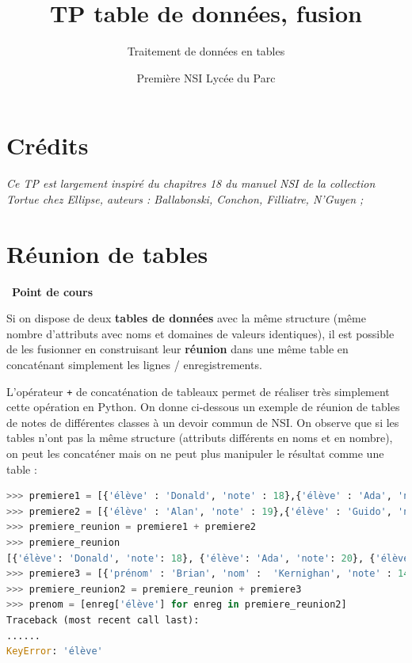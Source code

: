 \documentclass[
  11pt,
]{article}
\title{TP table de données, fusion}
\subtitle{Traitement de données en tables}
\author{Première NSI Lycée du Parc}
\date{}
\newcommand{\passthrough}[1]{#1}
\newcounter{cours}
\newenvironment{cours}[1]
{\par \medskip   \addtocounter{cours}{1} \noindent  
\begin{bclogo}[arrondi =0.1,  ombre = true, barre=none, logo=\bcbook, marge=4]{~\textbf{Point de cours} \textbf{\thecours} {\itshape #1} }  \par}
{
\end{bclogo}
 \par \bigskip }
\begin{document}
\maketitle

\renewcommand*\contentsname{Table des matières}
{
\hypersetup{linkcolor=}
\setcounter{tocdepth}{3}
\tableofcontents
}
\hypertarget{cruxe9dits}{%
\section*{Crédits}\label{cruxe9dits}}

\emph{Ce TP est largement inspiré du chapitres 18 du manuel NSI de la
collection Tortue chez Ellipse, auteurs : Ballabonski, Conchon,
Filliatre, N'Guyen ;}

\hypertarget{ruxe9union-de-tables}{%
\section{Réunion de tables}\label{ruxe9union-de-tables}}

\begin{cours}{}

Si on dispose de deux \textbf{tables de données} avec la même structure
(même nombre d'attributs avec noms et domaines de valeurs identiques),
il est possible de les fusionner en construisant leur \textbf{réunion}
dans une même table en concaténant simplement les lignes /
enregistrements.

L'opérateur \passthrough{\lstinline!+!} de concaténation de tableaux
permet de réaliser très simplement cette opération en Python. On donne
ci-dessous un exemple de réunion de tables de notes de différentes
classes à un devoir commun de NSI. On observe que si les tables n'ont
pas la même structure (attributs différents en noms et en nombre), on
peut les concaténer mais on ne peut plus manipuler le résultat comme une
table :

\begin{lstlisting}[language=Python]
>>> premiere1 = [{'élève' : 'Donald', 'note' : 18},{'élève' : 'Ada', 'note' : 20}]
>>> premiere2 = [{'élève' : 'Alan', 'note' : 19},{'élève' : 'Guido', 'note' : 12}]
>>> premiere_reunion = premiere1 + premiere2
>>> premiere_reunion
[{'élève': 'Donald', 'note': 18}, {'élève': 'Ada', 'note': 20}, {'élève': 'Alan', 'note': 19}, {'élève': 'Guido', 'note': 12}]
>>> premiere3 = [{'prénom' : 'Brian', 'nom' :  'Kernighan', 'note' : 14},{'prénom' : 'Linus', 'nom' : 'Torvalds', 'note' : 8}]
>>> premiere_reunion2 = premiere_reunion + premiere3
>>> prenom = [enreg['élève'] for enreg in premiere_reunion2]
Traceback (most recent call last):
......
KeyError: 'élève'
\end{lstlisting}

\end{cours}
\end{document}
